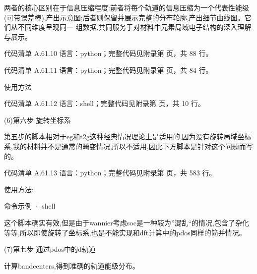 \documentclass[lang=cn,scheme=chinese,color=blue,device=normal,toc=onecol,math=cm]{elegantbook}
\begin{document}
两者的核心区别在于信息压缩程度:前者将每个轨道的信息压缩为一个代表性能级(可带误差棒),产出示意图;后者则保留并展示完整的分布轮廓,产出细节曲线图。它们从不同维度呈现同一 组数据,共同服务于对材料中元素局域电子结构的深入理解与展示。\par


\begin{codeindexbox}{代码清单 A.61.10}
语言：python；完整代码见附录第 \pageref{code:61:10} 页，共 88 行。
\end{codeindexbox}


\begin{codeindexbox}{代码清单 A.61.11}
语言：python；完整代码见附录第 \pageref{code:61:11} 页，共 84 行。
\end{codeindexbox}


使用方法\par


\begin{codeindexbox}{代码清单 A.61.12}
语言：shell；完整代码见附录第 \pageref{code:61:12} 页，共 10 行。
\end{codeindexbox}


(6)第六步 旋转坐标系\par


第五步的脚本相对于eg和t2g这种经典情况理论上是适用的,因为没有旋转局域坐标系,我的材料并不是通常的畸变情况,所以不适用,因此下方脚本是针对这个问题而写的。\par


\begin{codeindexbox}{代码清单 A.61.13}
语言：python；完整代码见附录第 \pageref{code:61:13} 页，共 583 行。
\end{codeindexbox}


使用方法:\par


\begin{inlinecodebox}{命令示例 · shell}
\end{inlinecodebox}


这个脚本确实有效,但是由于wannier考虑soc是一种较为”混乱“的情况,包含了杂化等等,所以即使旋转了坐标系,也是不能实现和dft计算中的pdos同样的简并情况。\par


(7)第七步 通过pdos中的d轨道\par


计算bandcenters,得到准确的轨道能级分布。\par
\end{document}
